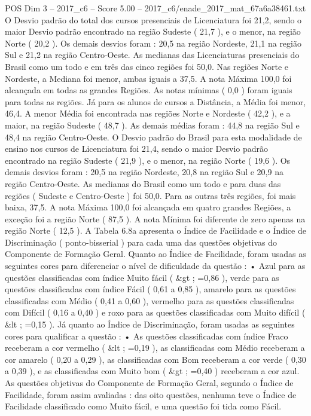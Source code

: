 \begin{textsample}{POS Dim 3 – 2017\_c6 – Score 5.00 – 2017\_c6/enade\_2017\_mat\_67a6a38461.txt}
O Desvio padrão do total dos cursos presenciais de Licenciatura foi 21,2, sendo o maior Desvio padrão encontrado na região Sudeste ( 21,7 ), e o menor, na região Norte ( 20,2 ).
Os demais desvios foram : 20,5 na região Nordeste, 21,1 na região Sul e 21,2 na região Centro-Oeste.
As medianas das Licenciaturas presenciais do Brasil como um todo e em três das cinco regiões foi 50,0.
Nas regiões Norte e Nordeste, a Mediana foi menor, ambas iguais a 37,5.
A nota Máxima 100,0 foi alcançada em todas as grandes Regiões.
As notas mínimas ( 0,0 ) foram iguais para todas as regiões.
Já para os alunos de cursos a Distância, a Média foi menor, 46,4.
A menor Média foi encontrada nas regiões Norte e Nordeste ( 42,2 ), e a maior, na região Sudeste ( 48,7 ).
As demais médias foram : 44,8 na região Sul e 48,4 na região Centro-Oeste.
O Desvio padrão do Brasil para esta modalidade de ensino nos cursos de Licenciatura foi 21,4, sendo o maior Desvio padrão encontrado na região Sudeste ( 21,9 ), e o menor, na região Norte ( 19,6 ).
Os demais desvios foram : 20,5 na região Nordeste, 20,8 na região Sul e 20,9 na região Centro-Oeste.
As medianas do Brasil como um todo e para duas das regiões ( Sudeste e Centro-Oeste ) foi 50,0.
Para as outras três regiões, foi mais baixa, 37,5.
A nota Máxima 100,0 foi alcançada em quatro grandes Regiões, a exceção foi a região Norte ( 87,5 ).
A nota Mínima foi diferente de zero apenas na região Norte ( 12,5 ).
A Tabela 6.8a apresenta o Índice de Facilidade e o Índice de Discriminação ( ponto-bisserial ) para cada uma das questões objetivas do Componente de Formação Geral.
Quanto ao Índice de Facilidade, foram usadas as seguintes cores para diferenciar o nível de dificuldade da questão : • Azul para as questões classificadas com índice Muito fácil ( \&gt ; =0,86 ), verde para as questões classificadas com índice Fácil ( 0,61 a 0,85 ), amarelo para as questões classificadas com Médio ( 0,41 a 0,60 ), vermelho para as questões classificadas com Difícil ( 0,16 a 0,40 ) e roxo para as questões classificadas com Muito difícil ( \&lt ; =0,15 ).
Já quanto ao Índice de Discriminação, foram usadas as seguintes cores para qualificar a questão : • As questões classificadas com índice Fraco receberam a cor vermelho ( \&lt ; =0,19 ), as classificadas com Médio receberam a cor amarelo ( 0,20 a 0,29 ), as classificadas com Bom receberam a cor verde ( 0,30 a 0,39 ), e as classificadas com Muito bom ( \&gt ; =0,40 ) receberam a cor azul.
As questões objetivas do Componente de Formação Geral, segundo o Índice de Facilidade, foram assim avaliadas : das oito questões, nenhuma teve o Índice de Facilidade classificado como Muito fácil, e uma questão foi tida como Fácil.

\end{textsample}
